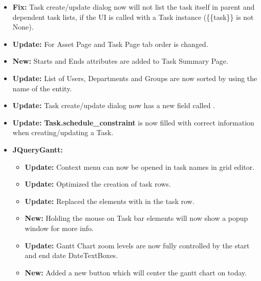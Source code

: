 \documentclass[a4paper,10pt,english]{sphinxmanual}
\begin{document}
\begin{itemize}
\begin{itemize}
\item {} 
\textbf{Fix:} Task create/update dialog now will not list the task itself in
parent and dependent task lists, if the UI is called with a Task instance
(\{\{task\}\} is not None).

\item {} 
\textbf{Update:} For Asset Page and Task Page tab order is changed.

\item {} 
\textbf{New:} Starts and Ends attributes are added to Task Summary Page.

\item {} 
\textbf{Update:} List of Users, Departments and Groups are now sorted by using
the name of the entity.

\item {} 
\textbf{Update:} Task create/update dialog now has a new field called
.

\item {} 
\textbf{Update:} \textbf{Task.schedule\_constraint} is now filled with correct
information when creating/updating a Task.

\item {} 
\textbf{JQueryGantt:}
\begin{itemize}
\item {} 
\textbf{Update:} Context menu can now be opened in task names in grid editor.

\item {} 
\textbf{Update:} Optimized the creation of task rows.

\item {} 
\textbf{Update:} Replaced the  elements with  in the task row.

\item {} 
\textbf{New:} Holding the mouse on Task bar elements will now show a popup
window for more info.

\item {} 
\textbf{Update:} Gantt Chart zoom levels are now fully controlled by the start
and end date DateTextBoxes.

\item {} 
\textbf{New:} Added a new button which will center the gantt chart on today.

\end{itemize}

\end{itemize}

\end{itemize}
\end{document}
